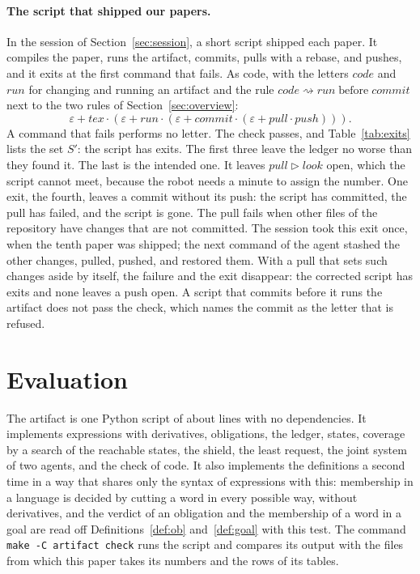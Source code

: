 \documentclass[acmsmall,nonacm,screen]{acmart}
\newcommand{\nm}[1]{\mathit{#1}}
\newcommand{\later}{\mathbin{\triangleright}}
\newcommand{\bef}{\mathrel{\text{before}}}
\newcommand{\creates}{\rightsquigarrow}
\newcommand{\tex}{\nm{tex}}
\newcommand{\commit}{\nm{commit}}
\newcommand{\push}{\nm{push}}
\newcommand{\pull}{\nm{pull}}
\newcommand{\look}{\nm{look}}
\newcommand{\code}{\nm{code}}
\newcommand{\run}{\nm{run}}
\newcommand{\claim}[2]{#2}
\begin{document}
\paragraph{The script that shipped our papers.} In the session of
Section~\ref{sec:session}, a short script shipped each paper. It compiles the paper,
runs the artifact, commits, pulls with a rebase, and pushes, and it exits at the first
command that fails. As code, with the letters $\code$ and $\run$ for changing and running an
artifact and the rule $\code \creates \run \bef \commit$ next to the two rules of
Section~\ref{sec:overview}:
\[
  \varepsilon + \tex \cdot (\varepsilon + \run \cdot (\varepsilon + \commit \cdot (\varepsilon + \pull \cdot \push))) .
\]
A command that fails performs no letter. The check passes, and Table~\ref{tab:exits} lists
the set $S'$: the script has \exShipExits{} exits. The first three leave the ledger no worse
than they found it. The last is the intended one. It leaves $\pull \later \look$ open, which
the script cannot meet, because the robot needs a minute to assign the number.
\claim{ship-one-exit}{One exit, the fourth, leaves a commit without its push}: the script
has committed, the pull has failed, and the script is gone. The pull fails when other files
of the repository have changes that are not committed. \claim{session-tenth}{The session
took this exit once, when the tenth paper was shipped; the next command of the agent stashed
the other changes, pulled, pushed, and restored them.} With a pull that sets such changes
aside by itself, the failure and the exit disappear: \claim{ship-corrected}{the corrected
script has \exShipExitsFixed{} exits and none leaves a push open}.
\claim{bad-script-refused}{A script that commits before it runs the artifact does not pass
the check, which names the commit as the letter that is refused.}

\section{Evaluation}
\label{sec:eval}

The artifact is one Python script of about \exLines{} lines with no dependencies. It implements
expressions with derivatives, obligations, the ledger, states, coverage by a search of the
reachable states, the shield, the least request, the joint system of two agents, and the
check of code. It also implements the definitions a second time in a way that shares only the syntax of
expressions with this: membership in a language is decided by cutting a word in every possible way, without
derivatives, and the verdict of an obligation and the membership of a word in a goal are
read off Definitions~\ref{def:ob} and~\ref{def:goal} with this test. The command
\texttt{make -C artifact check} runs the script and compares its output with the files from
which this paper takes its numbers and the rows of its tables.
\end{document}
